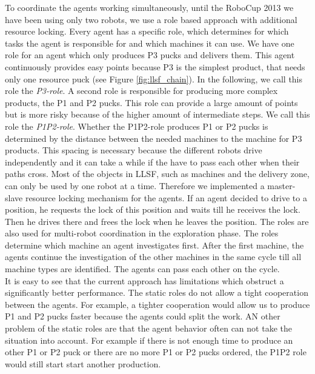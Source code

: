 To coordinate the agents working simultaneously, until the RoboCup 2013 we have been using only two robots, we use a role based approach with additional resource locking. Every agent has a specific role, which determines for which tasks the agent is responsible for and which machines it can use. We have one role for an agent which only produces P3 pucks and delivers them. This agent continuously provides easy points because P3 is the simplest product, that needs only one resource puck (see Figure \ref{fig:llsf_chain}). In the following, we call this role the \textit{P3-role}. A second role is responsible for producing  more complex products, the P1 and P2 pucks. This role can provide a large amount of points but is more risky because of the higher amount of intermediate steps. We call this role the \textit{P1P2-role}. Whether the P1P2-role produces P1 or P2 pucks is determined by the distance between the needed machines to the machine for P3 products. This spacing is necessary because the different robots drive independently and it can take a while if the have to pass each other when their paths cross. Most of the objects in LLSF, such as machines and the delivery zone, can only be used by one robot at a time. Therefore we implemented a master-slave resource locking mechanism for the agents. If an agent decided to drive to a position, he requests the lock of this position and waits till he receives the lock. Then he drives there and frees the lock when he leaves the position. The roles are also used for multi-robot coordination in the exploration phase. The roles determine which machine an agent investigates first. After the first machine, the agents continue the investigation of the other machines in the same cycle till all machine types are identified. The agents can pass each other on the cycle.\\
It is easy to see that the current approach has limitations which obstruct a significantly better performance. The static roles do not allow a tight cooperation between the agents. For example, a tighter cooperation would allow us to produce P1 and P2 pucks faster because the agents could split the work. AN other problem of the static roles are that the agent behavior often can not take the situation into account. For example if there is not enough time to produce an other P1 or P2 puck or there are no more P1 or P2 pucks ordered, the P1P2 role would still start start another production.\\
